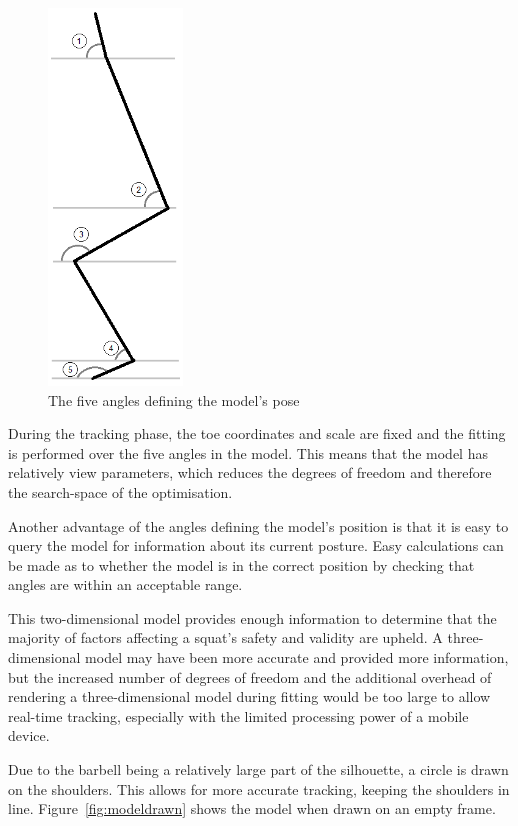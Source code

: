 \begin{figure}[H]
    \centering
	\includegraphics[height=10cm]{algorithm/images/model_angles}
\caption{The five angles defining the model's pose}
\label{fig:modelangles}
\end{figure}

During the tracking phase, the toe coordinates and scale are fixed and the fitting is performed over the five angles in the model. This means that the model has relatively view parameters, which reduces the degrees of freedom and therefore the search-space of the optimisation.

Another advantage of the angles defining the model's position is that it is easy to query the model for information about its current posture. Easy calculations can be made as to whether the model is in the correct position by checking that angles are within an acceptable range.

This two-dimensional model provides enough information to determine that the majority of factors affecting a squat's safety and validity are upheld. A three-dimensional model may have been more accurate and provided more information, but the increased number of degrees of freedom and the additional overhead of rendering a three-dimensional model during fitting would be too large to allow real-time tracking, especially with the limited processing power of a mobile device.

Due to the barbell being a relatively large part of the silhouette, a circle is drawn on the shoulders. This allows for more accurate tracking, keeping the shoulders in line. Figure~\ref{fig:modeldrawn} shows the model when drawn on an empty frame.


